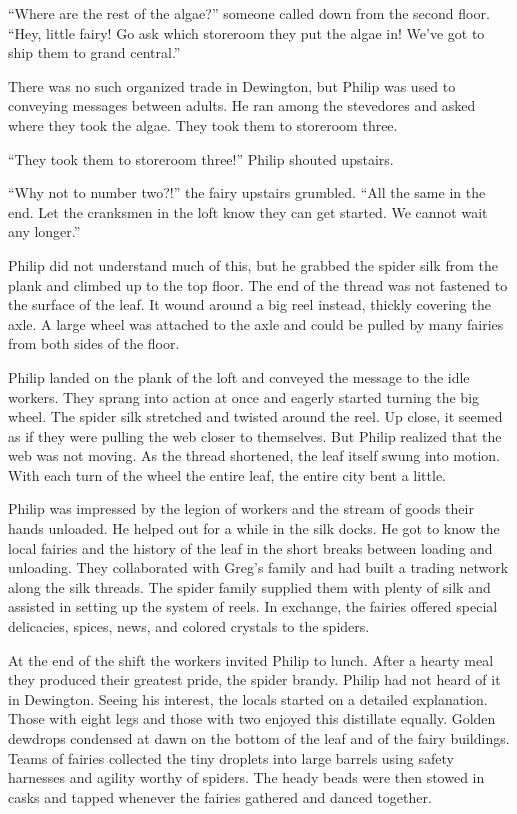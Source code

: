 \documentclass[10pt]{memoir}
\begin{document}
``Where are the rest of the algae?'' someone called down from the second floor.
``Hey, little fairy! Go ask which storeroom they put the algae in! We've got to
ship them to grand central.''

There was no such organized trade in Dewington, but Philip was used to
conveying messages between adults. He ran among the stevedores and asked where
they took the algae. They took them to storeroom three.

``They took them to storeroom three!'' Philip shouted upstairs.

``Why not to number two?!'' the fairy upstairs grumbled. ``All the same in the
end. Let the cranksmen in the loft know they can get started. We cannot wait
any longer.''

Philip did not understand much of this, but he grabbed the spider silk from the
plank and climbed up to the top floor. The end of the thread was not fastened
to the surface of the leaf. It wound around a big reel instead, thickly
covering the axle. A large wheel was attached to the axle and could be pulled
by many fairies from both sides of the floor.

Philip landed on the plank of the loft and conveyed the message to the idle
workers. They sprang into action at once and eagerly started turning the big
wheel. The spider silk stretched and twisted around the reel.  Up close, it
seemed as if they were pulling the web closer to themselves. But Philip
realized that the web was not moving. As the thread shortened, the leaf itself
swung into motion. With each turn of the wheel the entire leaf, the entire city
bent a little.

Philip was impressed by the legion of workers and the stream of goods their
hands unloaded. He helped out for a while in the silk docks. He got to know the
local fairies and the history of the leaf in the short breaks between loading
and unloading. They collaborated with Greg's family and had built a trading
network along the silk threads. The spider family supplied them with plenty of
silk and assisted in setting up the system of reels. In exchange, the fairies
offered special delicacies, spices, news, and colored crystals to the spiders.

At the end of the shift the workers invited Philip to lunch. After a hearty
meal they produced their greatest pride, the spider brandy. Philip had not
heard of it in Dewington. Seeing his interest, the locals started on a detailed
explanation. Those with eight legs and those with two enjoyed this distillate
equally. Golden dewdrops condensed at dawn on the bottom of the leaf and of the
fairy buildings. Teams of fairies collected the tiny droplets into large
barrels using safety harnesses and agility worthy of spiders. The heady
beads were then stowed in casks and tapped whenever the fairies gathered and
danced together.
\end{document}
